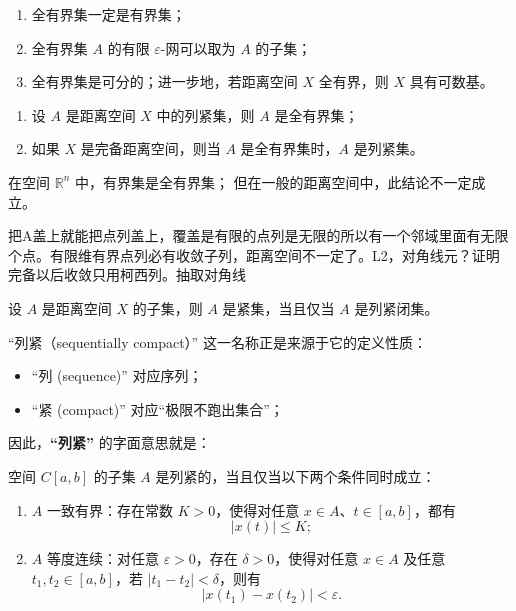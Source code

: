 \begin{proposition}[全有界集的性质]
\begin{enumerate}[(1)]
  \item 全有界集一定是有界集；
  \item 全有界集 $A$ 的有限 $\varepsilon$-网可以取为 $A$ 的子集；
  \item 全有界集是可分的；进一步地，若距离空间 $X$ 全有界，则 $X$ 具有可数基。
\end{enumerate}
\end{proposition}
\begin{theorem}
\begin{enumerate}[(1)]
  \item 设 $A$ 是距离空间 $X$ 中的列紧集，则 $A$ 是全有界集；
  \item 如果 $X$ 是完备距离空间，则当 $A$ 是全有界集时，$A$ 是列紧集。
\end{enumerate}

在空间 $\mathbb{R}^n$ 中，有界集是全有界集；  
但在一般的距离空间中，此结论不一定成立。
\end{theorem}
把A盖上就能把点列盖上，覆盖是有限的点列是无限的所以有一个邻域里面有无限个点。有限维有界点列必有收敛子列，距离空间不一定了。L2，对角线元？证明完备以后收敛只用柯西列。抽取对角线
\begin{theorem}[列近闭集的子集是紧集]
设 $A$ 是距离空间 $X$ 的子集，则 $A$ 是紧集，当且仅当 $A$ 是列紧闭集。
\end{theorem}
\begin{remark}
 “列紧（sequentially compact）” 这一名称正是来源于它的定义性质：

\begin{itemize}
  \item “列 (sequence)” 对应序列；
  \item “紧 (compact)” 对应“极限不跑出集合”；
\end{itemize}

因此，\textbf{“列紧”} 的字面意思就是：


\end{remark}
\begin{theorem}[Arzelà 定理]
空间 $C[a,b]$ 的子集 $A$ 是列紧的，当且仅当以下两个条件同时成立：

\begin{enumerate}[(1)]
  \item $A$ 一致有界：存在常数 $K>0$，使得对任意 $x\in A$、$t\in[a,b]$，都有
  \[
  |x(t)| \le K;
  \]
  
  \item $A$ 等度连续：对任意 $\varepsilon>0$，存在 $\delta>0$，使得对任意 $x\in A$ 及任意 $t_1,t_2\in[a,b]$，若 $|t_1-t_2|<\delta$，则有
  \[
  |x(t_1)-x(t_2)|<\varepsilon.
  \]
\end{enumerate}
\end{theorem}
